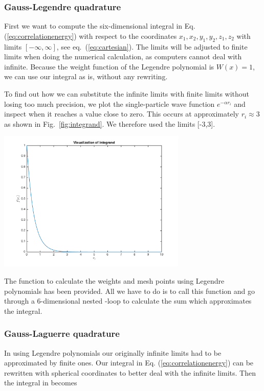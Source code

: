 \documentclass{article}
\begin{document}
\begin{multicols}{2}
\subsubsection{Gauss-Legendre quadrature}

First we want to compute the six-dimensional integral in Eq. (\ref{eq:correlationenergy}) with respect to the coordinates $x_1, x_2, y_1, y_2, z_1, z_2$ with limits $[-\infty, \infty]$, see eq.~(\ref{eq:cartesian}). The limits will be adjusted to finite limits when doing the numerical calculation, as computers cannot deal with infinite. Because the weight function of the Legendre polynomial is $W(x) = 1$, we can use our integral as is, without any rewriting.

To find out how we can substitute the infinite limits with finite limits without losing too much precision, we plot the single-particle wave function $e^{-\alpha r_i}$ and inspect when it reaches a value close to zero. This occurs at approximately $r_i \approx 3$ as shown in Fig.~\ref{fig:integrand}. We therefore used the limits [-3,3].

\begin{center}
	\includegraphics[width=90mm]{integrand.png} 	
	\label{fig:integrand}
\end{center}
The function \verb@gauleg@ to calculate the weights and mesh points using Legendre polynomials has been provided. All we have to do is to call this function and go through a 6-dimensional nested \verb@for@-loop to calculate the sum which approximates the integral. 






\subsubsection{Gauss-Laguerre quadrature}
In using Legendre polynomials our originally infinite limits had to be approximated by finite ones. Our integral in Eq. (\ref{eq:correlationenergy}) can be rewritten with spherical coordinates to better deal with the infinite limits. Then the integral in becomes


\end{multicols}
\end{document}
